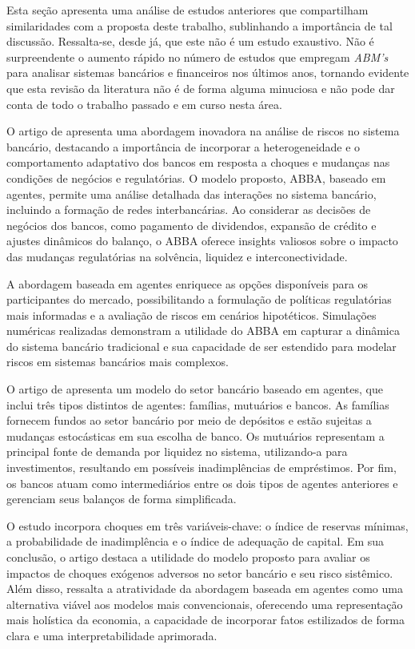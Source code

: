 \documentclass[hidelinks, article,12pt,oneside,a4paper,english,brazil,sumario=tradicional]{abntex2}
\begin{document}
Esta seção apresenta uma análise de estudos anteriores que compartilham similaridades com a proposta deste trabalho, sublinhando a importância de tal discussão. Ressalta-se, desde já, que este não é um estudo exaustivo. Não é surpreendente o aumento rápido no número de estudos que empregam \textit{ABM's} para analisar sistemas bancários e financeiros nos últimos anos, tornando evidente que esta revisão da literatura não é de forma alguma minuciosa e não pode dar conta de todo o trabalho passado e em curso nesta área.

O artigo de  apresenta uma abordagem inovadora na análise de riscos no sistema bancário, destacando a importância de incorporar a heterogeneidade e o comportamento adaptativo dos bancos em resposta a choques e mudanças nas condições de negócios e regulatórias. O modelo proposto, ABBA, baseado em agentes, permite uma análise detalhada das interações no sistema bancário, incluindo a formação de redes interbancárias. Ao considerar as decisões de negócios dos bancos, como pagamento de dividendos, expansão de crédito e ajustes dinâmicos do balanço, o ABBA oferece insights valiosos sobre o impacto das mudanças regulatórias na solvência, liquidez e interconectividade. 

A abordagem baseada em agentes enriquece as opções disponíveis para os participantes do mercado, possibilitando a formulação de políticas regulatórias mais informadas e a avaliação de riscos em cenários hipotéticos. Simulações numéricas realizadas demonstram a utilidade do ABBA em capturar a dinâmica do sistema bancário tradicional e sua capacidade de ser estendido para modelar riscos em sistemas bancários mais complexos. 


O artigo de  apresenta um modelo do setor bancário baseado em agentes, que inclui três tipos distintos de agentes: famílias, mutuários e bancos. As famílias fornecem fundos ao setor bancário por meio de depósitos e estão sujeitas a mudanças estocásticas em sua escolha de banco. Os mutuários representam a principal fonte de demanda por liquidez no sistema, utilizando-a para investimentos, resultando em possíveis inadimplências de empréstimos. Por fim, os bancos atuam como intermediários entre os dois tipos de agentes anteriores e gerenciam seus balanços de forma simplificada. 

O estudo incorpora choques em três variáveis-chave: o índice de reservas mínimas, a probabilidade de inadimplência e o índice de adequação de capital. Em sua conclusão, o artigo destaca a utilidade do modelo proposto para avaliar os impactos de choques exógenos adversos no setor bancário e seu risco sistêmico. Além disso, ressalta a atratividade da abordagem baseada em agentes como uma alternativa viável aos modelos mais convencionais, oferecendo uma representação mais holística da economia, a capacidade de incorporar fatos estilizados de forma clara e uma interpretabilidade aprimorada.
\end{document}
